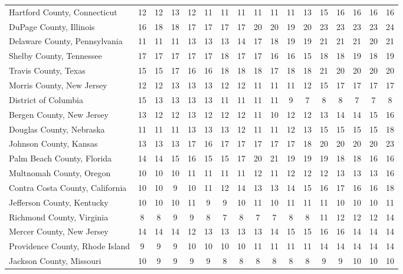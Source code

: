 \begin{landscape}
\begin{longtable}{lcccccccccccccccc}
	Hartford County, Connecticut & 12 & 12 & 13 & 12 & 11 & 11 & 11 & 11 & 11 & 11 & 13 & 15 & 16 & 16 & 16 & 16 \\
	DuPage County, Illinois & 16 & 18 & 18 & 17 & 17 & 17 & 17 & 20 & 20 & 19 & 20 & 23 & 23 & 23 & 23 & 24 \\
	Delaware County, Pennsylvania & 11 & 11 & 11 & 13 & 13 & 13 & 14 & 17 & 18 & 19 & 19 & 21 & 21 & 21 & 20 & 21 \\
	Shelby County, Tennessee & 17 & 17 & 17 & 17 & 17 & 18 & 17 & 17 & 16 & 16 & 15 & 18 & 18 & 19 & 18 & 19 \\
	Travis County, Texas & 15 & 15 & 17 & 16 & 16 & 18 & 18 & 18 & 17 & 18 & 18 & 21 & 20 & 20 & 20 & 20 \\
	Morris County, New Jersey & 12 & 12 & 13 & 13 & 13 & 12 & 12 & 11 & 11 & 11 & 12 & 15 & 17 & 17 & 17 & 17 \\
	District of Columbia & 15 & 13 & 13 & 13 & 13 & 11 & 11 & 11 & 11 & 9 & 7 & 8 & 8 & 7 & 7 & 8 \\
	Bergen County, New Jersey & 13 & 12 & 12 & 13 & 12 & 12 & 12 & 11 & 10 & 12 & 12 & 13 & 14 & 14 & 15 & 16 \\
	Douglas County, Nebraska & 11 & 11 & 11 & 13 & 13 & 13 & 12 & 11 & 11 & 12 & 13 & 15 & 15 & 15 & 15 & 18 \\
	Johnson County, Kansas & 13 & 13 & 13 & 17 & 16 & 17 & 17 & 17 & 17 & 17 & 18 & 20 & 20 & 20 & 20 & 23 \\
	Palm Beach County, Florida & 14 & 14 & 15 & 16 & 15 & 15 & 17 & 20 & 21 & 19 & 19 & 19 & 18 & 18 & 16 & 16 \\
	Multnomah County, Oregon & 10 & 10 & 10 & 11 & 11 & 11 & 11 & 12 & 11 & 12 & 12 & 12 & 13 & 13 & 13 & 16 \\
	Contra Costa County, California & 10 & 10 & 9 & 10 & 11 & 12 & 14 & 13 & 13 & 14 & 15 & 16 & 17 & 16 & 16 & 18 \\
	Jefferson County, Kentucky & 10 & 10 & 10 & 11 & 9 & 9 & 10 & 11 & 10 & 11 & 11 & 11 & 10 & 10 & 10 & 11 \\
	Richmond County, Virginia & 8 & 8 & 9 & 9 & 8 & 7 & 8 & 7 & 7 & 8 & 8 & 11 & 12 & 12 & 12 & 14 \\
	Mercer County, New Jersey & 14 & 14 & 14 & 12 & 13 & 13 & 13 & 13 & 14 & 15 & 15 & 16 & 16 & 14 & 14 & 14 \\
	Providence County, Rhode Island & 9 & 9 & 9 & 10 & 10 & 10 & 10 & 11 & 11 & 11 & 11 & 14 & 14 & 14 & 14 & 14 \\
	Jackson County, Missouri & 10 & 9 & 9 & 9 & 9 & 8 & 8 & 8 & 8 & 8 & 8 & 9 & 9 & 10 & 10 & 10 \\

\end{longtable}
\end{landscape}
